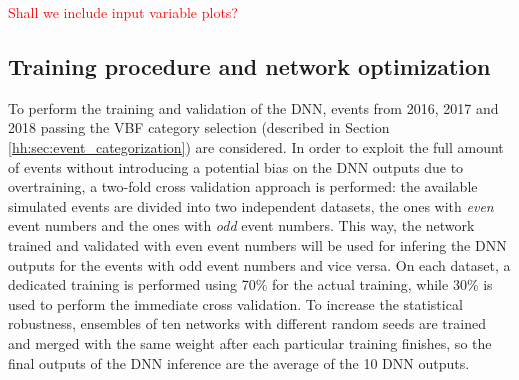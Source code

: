 \documentclass[../main.tex]{subfiles}
\begin{document}
\textcolor{red}{Shall we include input variable plots?}


\subsection{Training procedure and network optimization}
\label{subs:hh:multi_training}

To perform the training and validation of the DNN, events from 2016, 2017 and 2018 passing the VBF category selection (described in Section \ref{hh:sec:event_categorization}) are considered. In order to exploit the full amount of events without introducing a potential bias on the DNN outputs due to overtraining, a two-fold cross validation approach is performed: the available simulated events are divided into two independent datasets, the ones with \textit{even} event numbers and the ones with \textit{odd} event numbers. This way, the network trained and validated with even event numbers will be used for infering the DNN outputs for the events with odd event numbers and vice versa. On each dataset, a dedicated training is performed using 70\% for the actual training, while 30\% is used to perform the immediate cross validation. To increase the statistical robustness, ensembles of ten networks with different random seeds are trained and merged with the same weight after each particular training finishes, so the final outputs of the DNN inference are the average of the 10 DNN outputs.
\end{document}
